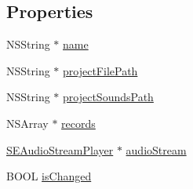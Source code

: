 \subsection*{Properties}
\begin{DoxyCompactItemize}
\item 
N\-S\-String $\ast$ \hyperlink{interface_s_e_project_adf05552fc2cf324eb3511d3bd1b8a996}{name}
\item 
N\-S\-String $\ast$ \hyperlink{interface_s_e_project_a2d54ed4720974d226ab30b8d32ef21dd}{project\-File\-Path}
\item 
N\-S\-String $\ast$ \hyperlink{interface_s_e_project_a59726fcb927ff059c83a1ac7b252db0d}{project\-Sounds\-Path}
\item 
N\-S\-Array $\ast$ \hyperlink{interface_s_e_project_ac1f0c37f5832b2ba24ac9bf65f0fdcce}{records}
\item 
\hyperlink{interface_s_e_audio_stream_player}{S\-E\-Audio\-Stream\-Player} $\ast$ \hyperlink{interface_s_e_project_af35059bb818d498c8a96053818016a26}{audio\-Stream}
\item 
B\-O\-O\-L \hyperlink{interface_s_e_project_a4da84c0c1ef729881956646b15762cc9}{is\-Changed}
\end{DoxyCompactItemize}



